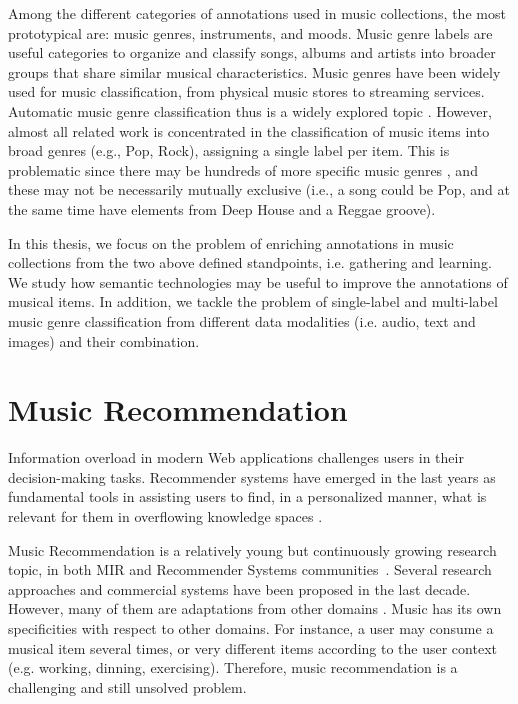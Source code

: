 Among the different categories of annotations used in music collections, the most prototypical are: music genres, instruments, and moods. 
Music genre labels are useful categories to organize and classify songs, albums and artists into broader groups that share similar musical characteristics. Music genres have been widely used for music classification, from physical music stores to streaming services. Automatic music genre classification thus is a widely explored topic \citep{sturm2012survey}.
However, almost all related work is concentrated in the classification of music items into broad genres (e.g., Pop, Rock), assigning a single label per item. This is problematic since there may be hundreds of more specific music genres \citep{pachet2000taxonomy}, and these may not be necessarily mutually exclusive (i.e., a song could be Pop, and at the same time have elements from Deep House and a Reggae groove). 

In this thesis, we focus on the problem of enriching annotations in music collections from the two above defined standpoints, i.e. gathering and learning. We study how semantic technologies may be useful to improve the annotations of musical items. In addition, we tackle the problem of single-label and multi-label music genre classification from different data modalities (i.e. audio, text and images) and their combination.


\section{Music Recommendation}
\label{sec:intro:recommendation}

Information overload in modern Web applications challenges users in their decision-making tasks. Recommender systems have emerged in the last years as fundamental tools in assisting users to find, in a personalized manner, what is relevant for them in overflowing knowledge spaces \cite{TODO}. 

Music Recommendation is a relatively young but continuously growing research topic, in both MIR and Recommender Systems communities~\citep{oscarBook}. Several research approaches and commercial systems have been proposed in the last decade. However, many of them are adaptations from other domains \citep{oscarBook}. 
Music has its own specificities with respect to other domains. For instance, a user may consume a musical item several times, or very different items according to the user context (e.g. working, dinning, exercising). Therefore, music recommendation is a challenging and still unsolved problem.

